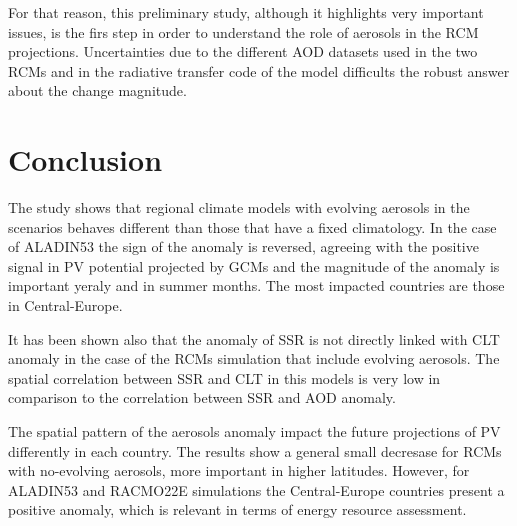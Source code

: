 For that reason, this preliminary study, although it highlights very important issues, is the firs step in order to understand the role of aerosols in the RCM projections. Uncertainties due to the different AOD datasets used in the two RCMs and in the radiative transfer code of the model difficults the robust answer about the change magnitude. 

\section{Conclusion}

The study shows that regional climate models with evolving aerosols in the scenarios behaves different than those that have a fixed climatology. In the case of ALADIN53 the sign of the anomaly is reversed, agreeing with the positive signal in PV potential projected by GCMs and the magnitude of the anomaly is important yeraly and in summer months. The most impacted countries are those in Central-Europe.

It has been shown also that the anomaly of SSR is not directly linked with CLT anomaly in the case of the RCMs simulation that include evolving aerosols. The spatial correlation between SSR and CLT in this models is very low in comparison to the correlation between SSR and AOD anomaly.

The spatial pattern of the aerosols anomaly impact the future projections of PV differently in each country. The results show a general small decresase for RCMs with no-evolving aerosols, more important in higher latitudes. However, for ALADIN53 and RACMO22E simulations the Central-Europe countries present a positive anomaly, which is relevant in terms of energy resource assessment.

